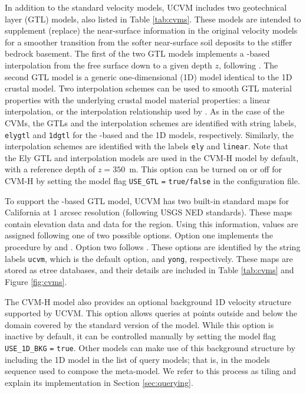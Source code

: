 In addition to the standard velocity models, UCVM includes two geotechnical layer (GTL) models, also listed in Table \ref{tab:cvms}. These models are intended to supplement (replace) the near-surface information in the original velocity models for a smoother transition from the softer near-surface soil deposits to the stiffer bedrock basement. The first of the two GTL models implements a \vsthirty-based interpolation from the free surface down to a given depth $z$, following \citet{Ely_2010_AGU}. The second GTL model is a generic one-dimensional (1D) model identical to the 1D crustal model. Two interpolation schemes can be used to smooth GTL material properties with the underlying crustal model material properties: a linear interpolation, or the interpolation relationship used by \citet{Ely_2010_AGU}. As in the case of the CVMs, the GTLs and the interpolation schemes are identified with string labels, \texttt{elygtl} and \texttt{1dgtl} for the \vsthirty-based and the 1D models, respectively. Similarly, the interpolation schemes are identified with the labels \texttt{ely} and \texttt{linear}. Note that the Ely GTL and interpolation models are used in the CVM-H model by default, with a reference depth of $z=350$~m. This option can be turned on or off for CVM-H by setting the model flag \texttt{USE\_GTL} \texttt{=} \texttt{true/false} in the configuration file.

To support the \vsthirty-based GTL model, UCVM has two built-in standard maps for California at 1 arcsec resolution (following USGS NED standards). These maps contain elevation data and \vsthirty{} data for the region. Using this information, \vsthirty{} values are assigned following one of two possible options. Option one implements the procedure by \citet{Wills_2006_BSSA} and \citet{Wald_2007_BSSA}. Option two follows \citet{Yong_2012_BSSA}. These options are identified by the string labels \texttt{ucvm}, which is the default option, and \texttt{yong}, respectively. These maps are stored as etree databases, and their details are included in Table \ref{tab:cvms} and Figure \ref{fig:cvms}.

The CVM-H model also provides an optional background 1D velocity structure supported by UCVM. This option allows queries at points outside and below the domain covered by the standard version of the model. While this option is inactive by default, it can be controlled manually by setting the model flag \texttt{USE\_1D\_BKG} \texttt{=} \texttt{true}. Other models can make use of this background structure by including the 1D model in the list of query models; that is, in the models sequence used to compose the meta-model. We refer to this process as tiling and explain its implementation in Section \ref{sec:querying}.

